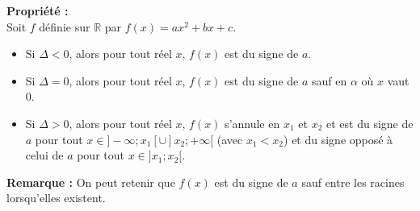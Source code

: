 \documentclass[11pt,a4paper]{article}
\begin{document}
\begin{mdframed}[style=proprieteStyle]
	\textbf{Propriété :} ~\\
	Soit $f$ définie sur $\mathbb{R}$ par $f(x)=ax^2+bx+c$.
	\begin{itemize}
		\item Si $\Delta<0$, alors pour tout réel $x$, $f(x)$ est du signe de $a$.
		\item Si $\Delta=0$, alors pour tout réel $x$, $f(x)$ est du signe de $a$ sauf en $\alpha$ où $x$ vaut $0$.
		\item Si $\Delta>0$, alors pour tout réel $x$, $f(x)$ s'annule en $x_1$ et $x_2$ et est du signe de $a$ pour
		      tout $x\in]-\infty;x_1[\cup]x_2;+\infty[$ (avec $x_1<x_2$) et du signe opposé à celui de $a$ pour tout $x\in]x_1;x_2[$.
	\end{itemize}
\end{mdframed}
\textbf{Remarque :} On peut retenir que $f(x)$ est du signe de $a$ sauf entre les racines lorsqu'elles existent.
\end{document}
